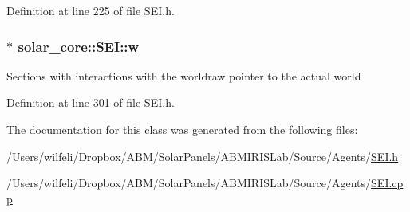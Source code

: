 Definition at line 225 of file S\+E\+I.\+h.

\hypertarget{classsolar__core_1_1_s_e_i_a82e0c6b5f6d83639a08c1bc357fd3466}{}
\subsubsection[{w}]{$\ast$ solar\+\_\+core\+::\+S\+E\+I\+::w\hspace{0.3cm}{\ttfamily [protected]}}\label{classsolar__core_1_1_s_e_i_a82e0c6b5f6d83639a08c1bc357fd3466}
Sections with interactions with the worldraw pointer to the actual world 

Definition at line 301 of file S\+E\+I.\+h.



The documentation for this class was generated from the following files\+:\begin{DoxyCompactItemize}
\item 
/\+Users/wilfeli/\+Dropbox/\+A\+B\+M/\+Solar\+Panels/\+A\+B\+M\+I\+R\+I\+S\+Lab/\+Source/\+Agents/\hyperlink{_s_e_i_8h}{S\+E\+I.\+h}\item 
/\+Users/wilfeli/\+Dropbox/\+A\+B\+M/\+Solar\+Panels/\+A\+B\+M\+I\+R\+I\+S\+Lab/\+Source/\+Agents/\hyperlink{_s_e_i_8cpp}{S\+E\+I.\+cpp}\end{DoxyCompactItemize}
